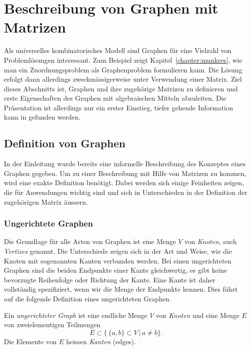 %
%
%
\section{Beschreibung von Graphen mit Matrizen
\label{buch:section:beschreibung-von-graphen-mit-matrizen}}
Als universelles kombinatorisches Modell sind Graphen für eine
Vielzahl von Problemlösungen interessant.
Zum Beispiel zeigt Kapitel~\ref{chapter:munkres}, wie man
ein Zuordnungsproblem als Graphenproblem formulieren kann.
Die Lösung erfolgt dann allerdings zweckmässigerweise unter
Verwendung einer Matrix.
Ziel dieses Abschnitts ist, Graphen und ihre zugehörige Matrizen
zu definieren und erste Eigenschaften des Graphen mit algebraischen
Mitteln abzuleiten.
Die Präsentation ist allerdings nur ein erster Einstieg, tiefer
gehende Information kann in \cite{skript:brualdi} gefunden werden.

\subsection{Definition von Graphen
\label{subsection:definition-von-graphen}}
In der Einleitung wurde bereits eine informelle
Beschreibung des Konzeptes eines Graphen gegeben.
Um zu einer Beschreibung mit Hilfe von Matrizen zu kommen,
wird eine exakte Definition benötigt.
Dabei werden sich einige Feinheiten zeigen, die für Anwendungen wichtig
sind und sich in Unterschieden in der Definition der zugehörigen Matrix 
äussern.

\subsubsection{Ungerichtete Graphen}
Die Grundlage für alle Arten von Graphen ist eine Menge $V$ von {\em Knoten},
auch {\em Vertizes} genannt.
%
%
Die Unterschiede zeigen sich in der Art und Weise, wie die Knoten
mit sogenannten Kanten
%
verbunden werden.
Bei einen ungerichteten Graphen sind die beiden Endpunkte einer Kante
gleichwertig, es gibt keine bevorzugte Reihenfolge oder Richtung der
Kante.
Eine Kante ist daher vollständig spezifiziert, wenn wir die
Menge der Endpunkte kennen.
Dies führt auf die folgende Definition eines ungerichteten Graphen.

\begin{definition}
\label{buch:def:ungerichteter-graph}
%
%
Ein {\em ungerichteter Graph} ist eine endliche Menge $V$ von {\em Knoten}
und eine Menge $E$ von zweielementigen Teilmengen 
\[
E \subset \{\, \{a,b\}\subset V\,|\, a\ne b\}.
\]
Die Elemente von $E$ heissen {\em Kanten} (edges).
\end{definition}

